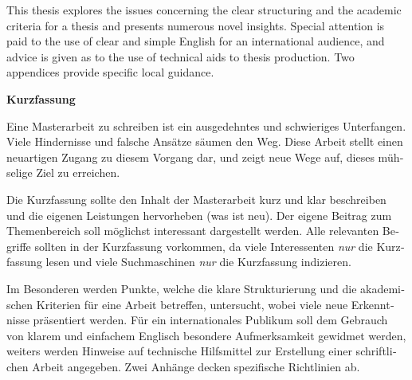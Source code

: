 This thesis explores the issues concerning the clear structuring and
the academic criteria for a thesis and presents numerous novel
insights. Special attention is paid to the use of clear and simple
English for an international audience, and advice is given as to the
use of technical aids to thesis production. Two appendices provide
specific local guidance.








\cleardoublepage

\vspace*{2cm}


\begin{otherlanguage}{austrian}

\begin{center}
{\Large\sffamily\bfseries Kurzfassung}
\end{center}

Eine Masterarbeit zu schreiben ist ein ausgedehntes und schwieriges
Unterfangen. Viele Hindernisse und falsche Ansätze säumen den
Weg. Diese Arbeit stellt einen neuartigen Zugang zu diesem Vorgang
dar, und zeigt neue Wege auf, dieses mühselige Ziel zu erreichen.

Die Kurzfassung sollte den Inhalt der Masterarbeit kurz und klar
beschreiben und die eigenen Leistungen hervorheben (was ist neu). Der
eigene Beitrag zum Themenbereich soll möglichst interessant
dargestellt werden. Alle relevanten Begriffe sollten in der
Kurzfassung vorkommen, da viele Interessenten \emph{nur} die
Kurzfassung lesen und viele Suchmaschinen \emph{nur} die Kurzfassung
indizieren.

Im Besonderen werden Punkte, welche die klare Strukturierung und die
akademischen Kriterien für eine Arbeit betreffen, untersucht, wobei
viele neue Erkenntnisse präsentiert werden. Für ein internationales
Publikum soll dem Gebrauch von klarem und einfachem Englisch besondere
Aufmerksamkeit gewidmet werden, weiters werden Hinweise auf technische
Hilfsmittel zur Erstellung einer schriftlichen Arbeit angegeben. Zwei
Anhänge decken spezifische Richtlinien ab.

\end{otherlanguage}



